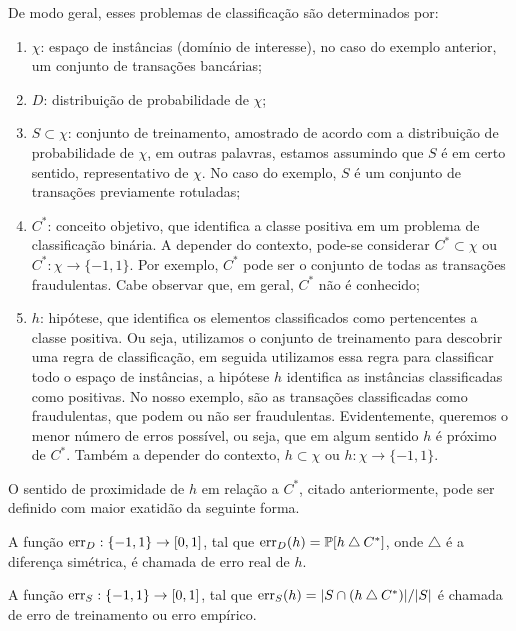 De modo geral, esses problemas de classificação são determinados por:
\begin{enumerate}
    \item $\chi$: espaço de instâncias (domínio de interesse), no caso do exemplo anterior, um conjunto de transações bancárias;
    \item $D$: distribuição de probabilidade de $\chi$;
    \item $S \subset \chi$: conjunto de treinamento,  amostrado de acordo com a distribuição de probabilidade de $\chi$, em outras palavras, estamos assumindo que $S$ é em certo sentido, representativo de $\chi$. No caso do exemplo, $S$ é um conjunto de transações previamente rotuladas;
    \item $C^*$: conceito objetivo, que identifica a classe positiva em um problema de classificação binária. A depender do contexto, pode-se considerar $C^* \subset \chi$ ou $C^*: \chi \rightarrow \{-1,1\}$. Por exemplo, $C^*$ pode ser o conjunto de todas as transações fraudulentas. Cabe observar que, em geral, $C^*$ não é conhecido;
    \item $h$: hipótese, que identifica os elementos classificados como pertencentes a classe positiva. Ou seja, utilizamos o conjunto de treinamento para descobrir uma regra de classificação, em seguida utilizamos essa regra para classificar todo o espaço de instâncias, a hipótese $h$ identifica as instâncias classificadas como positivas. No nosso exemplo, são as transações classificadas como fraudulentas, que podem ou não ser fraudulentas. Evidentemente, queremos o menor número de erros possível, ou seja, que em algum sentido $h$ é próximo de $C^*$. Também a depender do contexto, $h \subset \chi$ ou $h: \chi \rightarrow \{-1,1\}$.
\end{enumerate}{}

O sentido de proximidade de $h$ em relação a $C^*$, citado anteriormente, pode ser definido com maior exatidão da seguinte forma.
\begin{definicao}
A função $\operatorname{err}_D: \{-1,1\}  \rightarrow [0,1]$, tal que $\operatorname{err}_D(h) = \mathbb{P}[h \bigtriangleup C^*]$, onde $\bigtriangleup$ é a diferença simétrica, é chamada de erro real de $h$.
\end{definicao}{}

\begin{definicao}
A função $\operatorname{err}_S: \{-1,1\}  \rightarrow [0,1]$, tal que $\operatorname{err}_S(h) = | S \cap (h \bigtriangleup C^*)| / |S|$ é chamada de erro de treinamento ou erro empírico.
\end{definicao}{}

